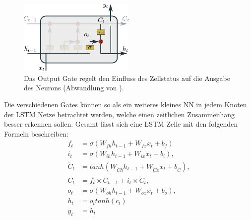                 \begin{figure}[ht]
                    \centering
                    \includegraphics[width=0.5\textwidth]{images/Illustrationen/LSTM_OG}
                    \caption[ass]{Das Output Gate regelt den Einfluss des Zellstatus auf die Ausgabe des Neurons (Abwandlung von \cite{OLAH2015}).}
                    \label{fig:LSTM_Output}
                \end{figure}
            
            Die verschiedenen Gates können so als ein weiteres kleines NN in jedem Knoten der LSTM Netze betrachtet werden, welche einen zeitlichen Zusammenhang besser erkennen sollen.
            Gesamt lässt sich eine LSTM Zelle mit den folgenden Formeln beschreiben:
            \begin{equation}
                \begin{split}
                    f_t &= \sigma\left(W_{fh}h_{t-1} + W_{fx}x_t + b_f\right) \\
                    i_t &= \sigma\left(W_{ih}h_{t-1} + W_{ix}x_t + b_i\right), \\
                    \tilde{C}_t &= tanh\left(W_{\tilde{C}h}h_{t-1} + W_{\tilde{C}x}x_t + b_{\tilde{C}}\right),\\
                    C_t &=f_t\times C_{t-1} + i_t\times \tilde{C}_t, \\
                    o_t &= \sigma\left(W_{oh}h_{t-1} + W_{ox}x_t + b_o \right), \\
                    h_t &= o_ttanh\left(c_t\right) \\
                    y_t &= h_t
                \end{split}
            \end{equation}
